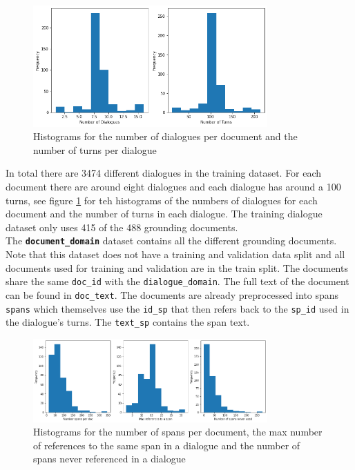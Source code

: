 \documentclass[11pt]{article}
\begin{document}
    \begin{figure}[h]
        \centering
        \includegraphics[width=0.8\textwidth]{number_of_dialogues_and_turns}
        \caption{Histograms for the number of dialogues per document and the number of turns per dialogue}
        \label{fig:histogram-dialogue-and-turns}
    \end{figure}

    In total there are 3474 different dialogues in the training dataset. For each document there are around eight dialogues and
    each dialogue has around a 100 turns, see figure \ref{fig:histogram-dialogue-and-turns} for teh histograms of the numbers of
    dialogues for each document and the number of turns in each dialogue.
    The training dialogue dataset only uses 415 of the 488 grounding documents.\\

    The \textbf{\texttt{document\_domain}} dataset contains all the different grounding documents. Note that this dataset does not have
    a training and validation data split and all documents used for training and validation are in the train split.
    The documents share the same \texttt{doc\_id} with the \texttt{dialogue\_domain}. The full text of the document
    can be found in \texttt{doc\_text}. The documents are already preprocessed into spans \texttt{spans} which themselves
    use the \texttt{id\_sp} that then refers back to the \texttt{sp\_id} used in the dialogue's turns. The \texttt{text\_sp}
    contains the span text.

    \begin{figure}[h]
        \centering
        \includegraphics[width=0.8\textwidth]{span_counts}
        \caption{Histograms for the number of spans per document, the max number of references to the same span in a dialogue and the number of
        spans never referenced in a dialogue }
        \label{fig:histogram-spans}
    \end{figure}
\end{document}
